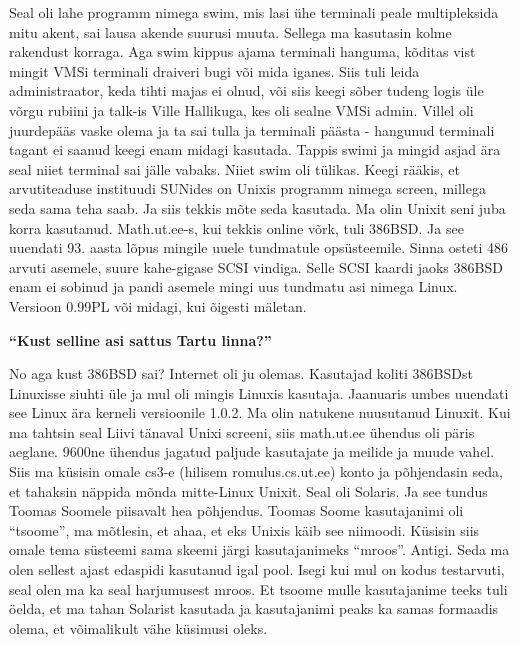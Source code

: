 Seal oli lahe programm nimega swim, mis lasi ühe terminali peale multipleksida mitu akent, sai lausa akende suurusi muuta. Sellega ma kasutasin kolme rakendust korraga. Aga swim kippus ajama terminali hanguma, kõditas vist mingit VMSi terminali draiveri bugi või mida iganes. Siis tuli leida administraator, keda tihti majas ei olnud, või siis keegi sõber tudeng logis üle võrgu rubiini ja talk-is Ville Hallikuga, kes oli sealne VMSi admin. Villel oli juurdepääs vaske olema ja ta sai tulla ja terminali päästa - hangunud terminali tagant ei saanud keegi enam midagi kasutada. Tappis swimi ja mingid asjad ära seal niiet terminal sai jälle vabaks. Niiet swim oli tülikas. Keegi rääkis, et arvutiteaduse instituudi SUNides on Unixis programm nimega screen, millega seda sama teha saab. Ja siis tekkis mõte seda kasutada. Ma olin Unixit seni juba korra kasutanud. Math.ut.ee-s, kui tekkis online võrk, tuli 386BSD. Ja see uuendati 93. aasta lõpus mingile uuele tundmatule opsüsteemile. Sinna osteti 486 arvuti asemele, suure kahe-gigase SCSI vindiga. Selle SCSI kaardi jaoks 386BSD enam ei sobinud ja pandi asemele mingi uus tundmatu asi nimega Linux. Versioon 0.99PL või midagi, kui õigesti mäletan. 

\textbf{\enquote{Kust selline asi sattus Tartu linna?}} 

No aga kust 386BSD sai? Internet oli ju olemas. Kasutajad koliti 386BSDst Linuxisse siuhti üle ja mul oli mingis Linuxis kasutaja. Jaanuaris umbes uuendati see Linux ära kerneli versioonile 1.0.2. Ma olin natukene nuusutanud Linuxit. Kui ma tahtsin seal Liivi tänaval Unixi screeni, siis math.ut.ee ühendus oli päris aeglane. 9600ne ühendus jagatud paljude kasutajate ja meilide ja muude vahel. Siis ma küsisin omale cs3-e (hilisem romulus.cs.ut.ee) konto ja põhjendasin seda, et tahaksin näppida mõnda mitte-Linux Unixit. Seal oli Solaris. Ja see tundus Toomas Soomele piisavalt hea põhjendus. Toomas Soome kasutajanimi oli \enquote{tsoome}, ma mõtlesin, et ahaa, et eks Unixis käib see niimoodi. Küsisin siis omale tema süsteemi sama skeemi järgi kasutajanimeks \enquote{mroos}. Antigi. Seda ma olen sellest ajast edaspidi kasutanud igal pool. Isegi kui mul on kodus testarvuti, seal olen ma ka seal harjumusest mroos. Et tsoome mulle kasutajanime teeks tuli öelda, et ma tahan Solarist kasutada ja kasutajanimi peaks ka samas formaadis olema, et võimalikult vähe küsimusi oleks. 

